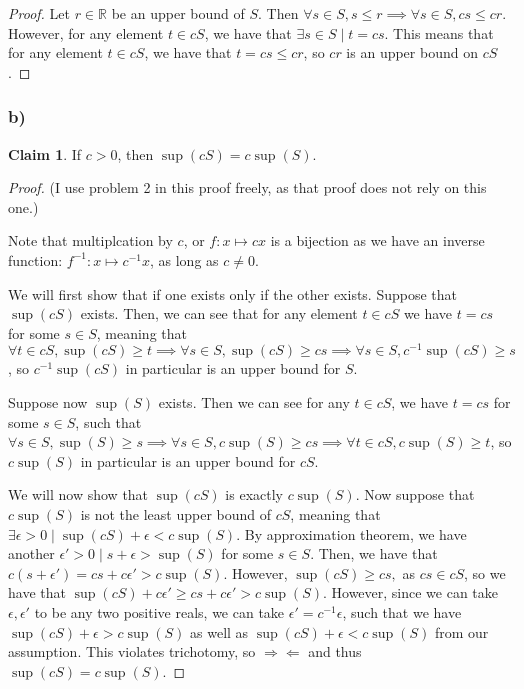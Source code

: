 \documentclass[12pt,letterpaper]{article}
\theoremstyle{definition}
\newtheorem*{claim}{Claim}
\newcommand{\contra}{\Rightarrow\!\Leftarrow}
\newcommand{\R}{\mathbb{R}}
\begin{document}
\begin{proof}
  Let $r \in \R$ be an upper bound of $S$. Then $\forall s \in S, s \leq r \implies
  \forall s \in S, cs \leq cr$. However, for any element $t \in cS$, we have that
  $\exists s \in S \mid t = cs$. This means that for any element $t \in cS$, we
  have that $t = cs \leq cr$, so $cr$ is an upper bound on $cS$.
\end{proof}

\subsubsection*{b)}

\begin{claim}
  If $c > 0$, then $\sup(cS) = c\sup(S)$.
\end{claim}

\begin{proof}
  (I use problem 2 in this proof freely, as that proof does not rely on this one.)
  
  Note that multiplcation by $c$, or $f: x \mapsto cx$ is a bijection as we have
  an inverse function: $f^{-1}: x \mapsto c^{-1}x$, as long as $c \neq 0$.

  We will first show that if one exists only if the other exists. Suppose that
  $\sup(cS)$ exists. Then, we can see that for any element
  $t \in cS$ we have $t = cs$ for some $s \in S$, meaning that $\forall t \in
  cS, \sup(cS) \geq t \implies \forall s \in S, \sup(cS) \geq cs \implies \forall s
  \in S, c^{-1}\sup(cS) \geq s$, so $c^{-1}\sup(cS)$ in particular is an upper
  bound for $S$.

  Suppose now $\sup(S)$ exists. Then we can see for any $t \in cS$, we have $t =
  cs$ for some $s \in S$, such that $\forall s \in S, \sup(S) \geq s \implies
  \forall s \in S, c\sup(S) \geq cs \implies \forall t \in cS, c\sup(S) \geq t$, so
  $c\sup(S)$ in particular is an upper bound for $cS$.

  We will now show that $\sup(cS)$ is exactly $c\sup(S)$.  Now suppose
  that $c\sup(S)$ is not the least upper bound of $cS$, meaning that
  $\exists \epsilon > 0 \mid \sup(cS) + \epsilon < c\sup(S)$. By
  approximation theorem, we have another $\epsilon' > 0 \mid s + \epsilon >
  \sup(S)$ for some $s \in S$. Then, we have that $c(s + \epsilon') = cs +
  c\epsilon' > c\sup(S)$. However, $\sup(cS) \geq cs,$ as $cs \in cS$, so we have
  that $\sup(cS) + c\epsilon' \geq cs + c\epsilon' > c\sup(S)$. However, since we
  can take $\epsilon, \epsilon'$ to be any two positive reals, we can take $\epsilon'
  = c^{-1}\epsilon$, such that we have $\sup(cS) + \epsilon > c\sup(S)$ as well
  as $\sup(cS) + \epsilon < c\sup(S)$ from our assumption. This violates trichotomy, so $\contra$
  and thus $\sup(cS) = c\sup(S)$.
\end{proof}
\end{document}
